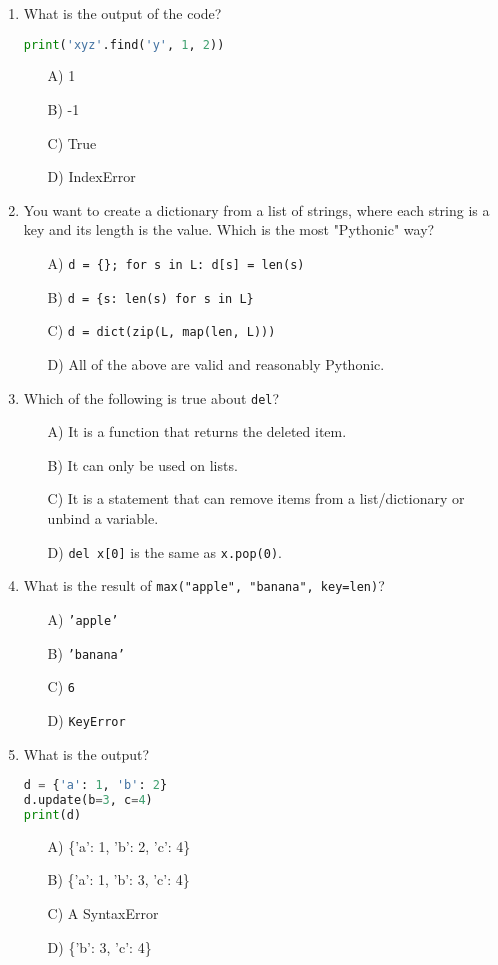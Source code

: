 \documentclass[9pt]{article}
\begin{document}
\begin{multicols}{2}
\begin{enumerate}
\item What is the output of the code?
\begin{lstlisting}[language=Python]
print('xyz'.find('y', 1, 2))
\end{lstlisting}
\begin{enumerate}
\item[A)] 1
\item[B)] -1
\item[C)] True
\item[D)] IndexError
\end{enumerate}

\item You want to create a dictionary from a list of strings, where each string is a key and its length is the value. Which is the most "Pythonic" way?
\begin{enumerate}
    \item[A)] \texttt{d = \{\}; for s in L: d[s] = len(s)}
    \item[B)] \texttt{d = \{s: len(s) for s in L\}}
    \item[C)] \texttt{d = dict(zip(L, map(len, L)))}
    \item[D)] All of the above are valid and reasonably Pythonic.
\end{enumerate}

\item Which of the following is true about \texttt{del}?
\begin{enumerate}
    \item[A)] It is a function that returns the deleted item.
    \item[B)] It can only be used on lists.
    \item[C)] It is a statement that can remove items from a list/dictionary or unbind a variable.
    \item[D)] \texttt{del x[0]} is the same as \texttt{x.pop(0)}.
\end{enumerate}

\item What is the result of \texttt{max("apple", "banana", key=len)}?
\begin{enumerate}
    \item[A)] \texttt{'apple'}
    \item[B)] \texttt{'banana'}
    \item[C)] \texttt{6}
    \item[D)] \texttt{KeyError}
\end{enumerate}

\item What is the output?
\begin{lstlisting}[language=Python]
d = {'a': 1, 'b': 2}
d.update(b=3, c=4)
print(d)
\end{lstlisting}
\begin{enumerate}
\item[A)] \{'a': 1, 'b': 2, 'c': 4\}
\item[B)] \{'a': 1, 'b': 3, 'c': 4\}
\item[C)] A SyntaxError
\item[D)] \{'b': 3, 'c': 4\}
\end{enumerate}


\end{enumerate}
\end{multicols}
\end{document}
